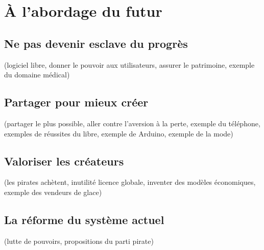 \chapter{À l'abordage du futur}

\section{Ne pas devenir esclave du progrès}
(logiciel libre, donner le pouvoir aux utilisateurs, assurer le patrimoine, exemple du domaine médical)
\section{Partager pour mieux créer}
(partager le plus possible, aller contre l'aversion à la perte, exemple du téléphone, exemples de réussites du libre, exemple de Arduino, exemple de la mode)
\section{Valoriser les créateurs}
(les pirates achètent, inutilité licence globale, inventer des modèles économiques, exemple des vendeurs de glace)
\section{La réforme du système actuel}
(lutte de pouvoirs, propositions du parti pirate)
